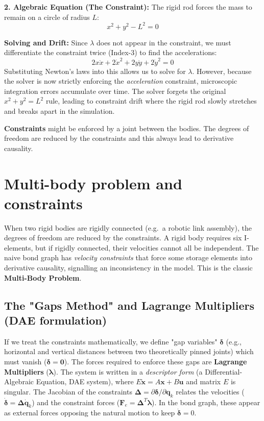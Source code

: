 \textbf{2. Algebraic Equation (The Constraint):}
The rigid rod forces the mass to remain on a circle of radius $L$:
\begin{equation}
x^2 + y^2 - L^2 = 0
\end{equation}

\textbf{Solving and Drift:}
Since $\lambda$ does not appear in the constraint, we must differentiate the constraint twice (Index-3) to find the accelerations:
\begin{equation}
2x\ddot{x} + 2\dot{x}^2 + 2y\ddot{y} + 2\dot{y}^2 = 0
\end{equation}
Substituting Newton's laws into this allows us to solve for $\lambda$. However, because the solver is now strictly enforcing the \textit{acceleration} constraint, microscopic integration errors accumulate over time. The solver forgets the original $x^2 + y^2 = L^2$ rule, leading to constraint drift where the rigid rod slowly stretches and breaks apart in the simulation.


\textbf{Constraints} might be enforced by a joint between the bodies. The degrees of freedom are reduced
by the constraints and this always lead to derivative causality. 


\section{Multi-body problem and constraints}

When two rigid bodies are rigidly connected (e.g.\ a robotic link assembly), the degrees of freedom are reduced by the constraints. A rigid body requires six I-elements, but if rigidly connected, their velocities cannot all be independent. The naive bond graph has \emph{velocity constraints} that force some storage elements into derivative causality, signalling an inconsistency in the model. This is the classic \textbf{Multi-Body Problem}.

\subsection{The "Gaps Method" and Lagrange Multipliers (DAE formulation)}
If we treat the constraints mathematically, we define "gap variables" $\boldsymbol{\delta}$ (e.g., horizontal and vertical distances between two theoretically pinned joints) which must vanish ($\boldsymbol{\delta} = \mathbf{0}$). The forces required to enforce these gaps are \textbf{Lagrange Multipliers} ($\boldsymbol{\lambda}$). 
The system is written in a \emph{descriptor form} (a Differential-Algebraic Equation, DAE system), where $E\dot{\mathbf{x}} = A\mathbf{x} + B\mathbf{u}$ and matrix $E$ is singular. The Jacobian of the constraints $\boldsymbol{\Delta} = \partial \boldsymbol{\delta} / \partial \mathbf{q}_k$ relates the velocities ($\dot{\boldsymbol{\delta}} = \boldsymbol{\Delta}\dot{\mathbf{q}}_k$) and the constraint forces ($\mathbf{F}_e = \boldsymbol{\Delta}^T\boldsymbol{\lambda}$). In the bond graph, these appear as external forces opposing the natural motion to keep $\dot{\boldsymbol{\delta}} = 0$.

